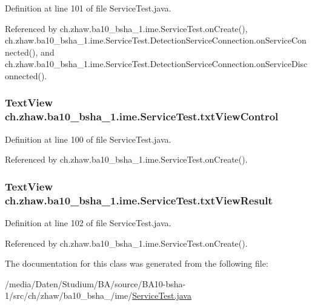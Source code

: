 Definition at line 101 of file ServiceTest.java.

Referenced by ch.zhaw.ba10\_\-bsha\_\-1.ime.ServiceTest.onCreate(), ch.zhaw.ba10\_\-bsha\_\-1.ime.ServiceTest.DetectionServiceConnection.onServiceConnected(), and ch.zhaw.ba10\_\-bsha\_\-1.ime.ServiceTest.DetectionServiceConnection.onServiceDisconnected().\hypertarget{classch_1_1zhaw_1_1ba10__bsha__1_1_1ime_1_1ServiceTest_a3eedc453bc997b1c3b6fed0a3c5cd0d5}{
\subsubsection[{txtViewControl}]{\setlength{\rightskip}{0pt plus 5cm}TextView {\bf ch.zhaw.ba10\_\-bsha\_\-1.ime.ServiceTest.txtViewControl}}}
\label{classch_1_1zhaw_1_1ba10__bsha__1_1_1ime_1_1ServiceTest_a3eedc453bc997b1c3b6fed0a3c5cd0d5}


Definition at line 100 of file ServiceTest.java.

Referenced by ch.zhaw.ba10\_\-bsha\_\-1.ime.ServiceTest.onCreate().\hypertarget{classch_1_1zhaw_1_1ba10__bsha__1_1_1ime_1_1ServiceTest_a9f9b094cd1d2a8d0f485a8e5f56da93c}{
\subsubsection[{txtViewResult}]{\setlength{\rightskip}{0pt plus 5cm}TextView {\bf ch.zhaw.ba10\_\-bsha\_\-1.ime.ServiceTest.txtViewResult}}}
\label{classch_1_1zhaw_1_1ba10__bsha__1_1_1ime_1_1ServiceTest_a9f9b094cd1d2a8d0f485a8e5f56da93c}


Definition at line 102 of file ServiceTest.java.

Referenced by ch.zhaw.ba10\_\-bsha\_\-1.ime.ServiceTest.onCreate().

The documentation for this class was generated from the following file:\begin{DoxyCompactItemize}
\item 
/media/Daten/Studium/BA/source/BA10-\/bsha-\/1/src/ch/zhaw/ba10\_\-bsha\_/ime/\hyperlink{ServiceTest_8java}{ServiceTest.java}\end{DoxyCompactItemize}
